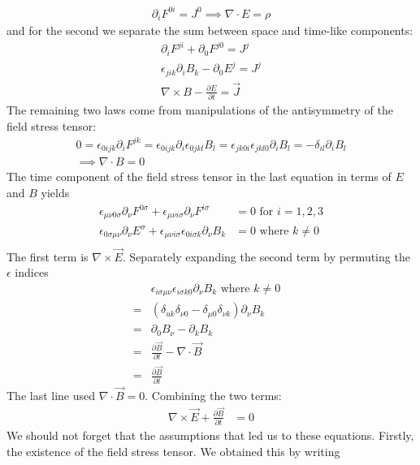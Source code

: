\begin{align*}
\partial_i F^{0i} = J^0 \implies \nabla \cdot E = \rho
\end{align*}
and for the second we separate the sum between space and time-like components:
\begin{align*}
\partial_i F^{ji} + \partial_0 F^{j0} = J^j\\
\epsilon_{jik} \partial_i B_k - \partial_0 E^j = J^j\\
\nabla \times B - \frac{\partial E}{\partial t} = \vec J
\end{align*}
The remaining two laws come from manipulations of the antisymmetry of the field stress tensor:
\begin{align*}
0 = \epsilon_{0ijk} \partial_i F^{jk} =
\epsilon_{0ijk} \partial_i \epsilon_{0jkl} B_l =
\epsilon_{jk0i}  \epsilon_{jkl0} \partial_i B_l  =
-\delta_{il} \partial_i B_l  \\
\implies \nabla \cdot B = 0
\end{align*}
The time component of the field stress tensor in the last equation in terms of $E$ and $B$ yields
\begin{align*}
\epsilon_{\mu\nu0\sigma} \partial_\nu F^{0\sigma} + \epsilon_{\mu\nu i\sigma} \partial_\nu F^{i\sigma}&= 0 \text { for } i=1,2,3\\
\epsilon_{0\sigma\mu\nu} \partial_\nu E^{\sigma} + \epsilon_{\mu\nu i\sigma}  \epsilon_{0i\sigma k} \partial_\nu B_k&= 0 \text{ where } k\neq 0\\
\end{align*}
The first term is $\nabla \times \vec E$. Separately expanding the second term by permuting the $\epsilon$ indices
\begin{align*}
&\epsilon_{i\sigma \mu\nu}  \epsilon_{i\sigma k 0}  \partial_\nu B_k \text{ where } k\neq 0\\
=&(\delta_{uk} \delta_{\nu 0} - \delta_{\mu 0} \delta_{\nu k} )  \partial_\nu B_k\\
=& \partial_0 B_\nu - \partial_k B_k&\\
=&\frac{\partial \vec B}{\partial t} - \nabla \cdot \vec B\\
=&\frac{\partial \vec B}{\partial t}&
\end{align*}
The last line used $\nabla \cdot \vec B = 0$. Combining the two terms:
\begin{align*}
\nabla \times \vec E + \frac{\partial \vec B}{\partial t}&= 0
\end{align*}
We should not forget that the assumptions that led us to these equations. Firstly, the  existence of the field stress tensor. We obtained this by writing
